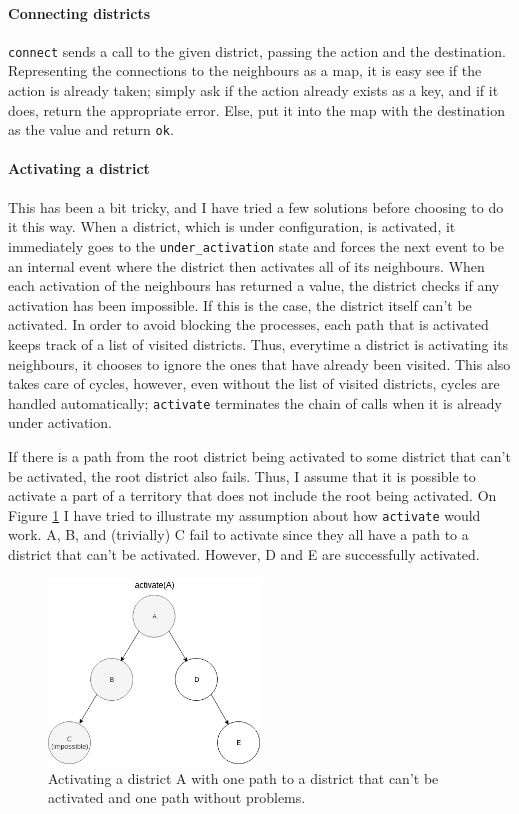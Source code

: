 \paragraph{Connecting districts} \texttt{connect} sends a call to the given district, passing the action and the destination. Representing the connections to the neighbours as a map, it is easy see if the action is already taken; simply ask if the action already exists as a key, and if it does, return the appropriate error. Else, put it into the map with the destination as the value and return \texttt{ok}.

\paragraph{Activating a district} This has been a bit tricky, and I have tried a few solutions before choosing to do it this way. When a district, which is under configuration, is activated, it immediately goes to the \texttt{under\_activation} state and forces the next event to be an internal event where the district then activates all of its neighbours. When each activation of the neighbours has returned a value, the district checks if any activation has been impossible. If this is the case, the district itself can't be activated. In order to avoid blocking the processes, each path that is activated keeps track of a list of visited districts. Thus, everytime a district is activating its neighbours, it chooses to ignore the ones that have already been visited. This also takes care of cycles, however, even without the list of visited districts, cycles are handled automatically; \texttt{activate} terminates the chain of calls when it is already under activation.

If there is a path from the root district being activated to some district that can't be activated, the root district also fails. Thus, I assume that it is possible to activate a part of a territory that does not include the root being activated. On Figure \ref{fig:activate} I have tried to illustrate my assumption about how \texttt{activate} would work. A, B, and (trivially) C fail to activate since they all have a path to a district that can't be activated. However, D and E are successfully activated.
\begin{figure}
  \centering
  \includegraphics[width=0.5\textwidth]{figures/activate}
  \caption{Activating a district A with one path to a district that can't be activated and one path without problems.}\label{fig:activate}
\end{figure}

